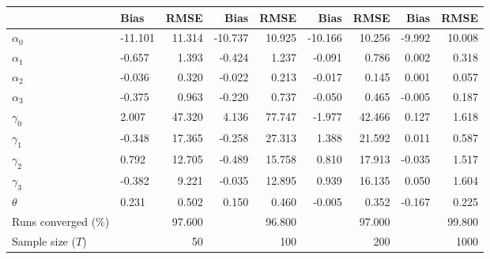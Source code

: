 
\begin{tabular}[t]{llrrrrrrr}
\toprule
  & Bias & RMSE & Bias & RMSE & Bias & RMSE & Bias & RMSE\\
\midrule
$\alpha_{0}$ & -11.101 & 11.314 & -10.737 & 10.925 & -10.166 & 10.256 & -9.992 & 10.008\\
$\alpha_{1}$ & -0.657 & 1.393 & -0.424 & 1.237 & -0.091 & 0.786 & 0.002 & 0.318\\
$\alpha_{2}$ & -0.036 & 0.320 & -0.022 & 0.213 & -0.017 & 0.145 & 0.001 & 0.057\\
$\alpha_{3}$ & -0.375 & 0.963 & -0.220 & 0.737 & -0.050 & 0.465 & -0.005 & 0.187\\
$\gamma_{0}$ & 2.007 & 47.320 & 4.136 & 77.747 & -1.977 & 42.466 & 0.127 & 1.618\\
$\gamma_{1}$ & -0.348 & 17.365 & -0.258 & 27.313 & 1.388 & 21.592 & 0.011 & 0.587\\
$\gamma_{2}$ & 0.792 & 12.705 & -0.489 & 15.758 & 0.810 & 17.913 & -0.035 & 1.517\\
$\gamma_{3}$ & -0.382 & 9.221 & -0.035 & 12.895 & 0.939 & 16.135 & 0.050 & 1.604\\
$\theta$ & 0.231 & 0.502 & 0.150 & 0.460 & -0.005 & 0.352 & -0.167 & 0.225\\
Runs converged (\%) &  & 97.600 &  & 96.800 &  & 97.000 &  & 99.800\\
Sample size ($T$) &  & 50 &  & 100 &  & 200 &  & 1000\\
\bottomrule
\end{tabular}
